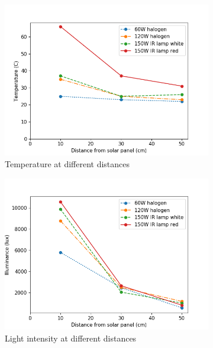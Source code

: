 \begin{figure}
	\centering
	\begin{subfigure}[b]{0.62\textwidth}
		\includegraphics[width=\textwidth]{pics/light_experiment_temp.png}
		\caption{Temperature at different distances}
		\label{fig:light_temp}
	\end{subfigure}
	\begin{subfigure}[b]{0.62\textwidth}
		\includegraphics[width=\textwidth]{pics/light_experiment_lux.png}
		\caption{Light intensity at different distances}
		\label{fig:light_lux}
	\end{subfigure}
	\caption{}
\end{figure}


